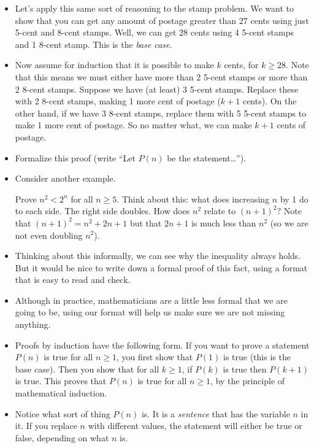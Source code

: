 \documentclass[12pt]{article}
\theoremstyle{plain}
\theoremstyle{definition}
\theoremstyle{remark}
\newcommand{\ex}{\noindent{\bf Ex: }}
\begin{document}
\begin{itemize}

  \item Let's apply this same sort of reasoning to the stamp problem.  We want to show that you can get any amount of postage greater than $27$ cents using just 5-cent and 8-cent stamps.  Well, we can get $28$ cents using 4 5-cent stamps and 1 8-cent stamp.  This is the {\em base case}.

  \item Now assume for induction that it is possible to make $k$ cents, for $k \ge 28$.  Note that this means we must either have more than 2 5-cent stamps or more than 2 8-cent stamps.  Suppose we have (at least) 3 5-cent stamps.  Replace these with 2 8-cent stamps, making 1 more cent of postage ($k+1$ cents).  On the other hand, if we have 3 8-cent stamps, replace them with 5 5-cent stamps to make 1 more cent of postage.  So no matter what, we can make $k+1$ cents of postage.

  \item Formalize this proof (write ``Let $P(n)$ be the statement\ldots'').


\item Consider another example.

\ex Prove $n^2 < 2^n$ for all $n \ge 5$.  Think about this: what does increasing $n$ by 1 do to each side.  The right side doubles.  How does $n^2$ relate to $(n+1)^2$?  Note that $(n+1)^2 = n^2 + 2n + 1$ but that $2n + 1$ is much less than $n^2$ (so we are not even doubling $n^2$).

\item Thinking about this informally, we can see why the inequality always holds.  But it would be nice to write down a formal proof of this fact, using a format that is easy to read and check.

\item Although in practice, mathematicians are a little less formal that we are going to be, using our format will help us make sure we are not missing anything.

\item Proofs by induction have the following form.  If you want to prove a statement $P(n)$ is true for all $n \ge 1$, you first show that $P(1)$ is true (this is the base case).  Then you show that for all $k \ge 1$, if $P(k)$ is true then $P(k+1)$ is true.  This proves that $P(n)$ is true for all $n \ge 1$, by the principle of mathematical induction.

\item Notice what sort of thing $P(n)$ is.  It is a \emph{sentence} that has the variable $n$ in it.  If you replace $n$ with different values, the statement will either be true or false, depending on what $n$ is.


\end{itemize}
\end{document}
